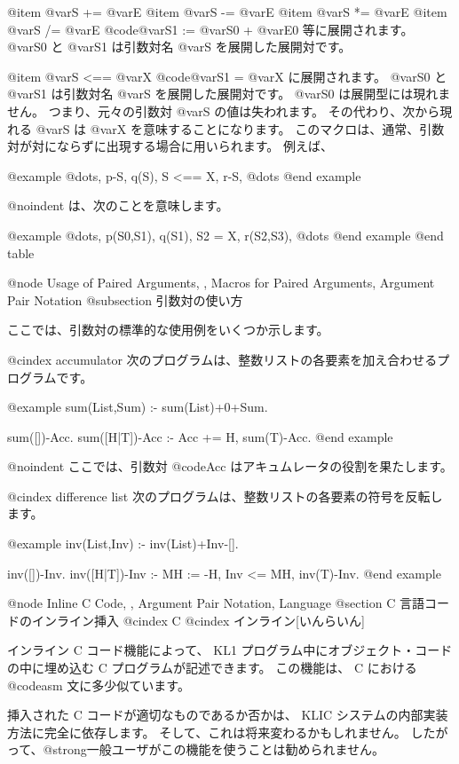 @item @var{S} += @var{E}
@item @var{S} -= @var{E}
@item @var{S} *= @var{E}
@item @var{S} /= @var{E}
 @code{@var{S1} := @var{S0} + @var{E0}} 等に展開されます。 
@var{S0} と @var{S1} は引数対名 @var{S} を展開した展開対です。

@item @var{S} <== @var{X}
@code{@var{S1} = @var{X}} に展開されます。 
@var{S0} と @var{S1} は引数対名 @var{S} を展開した展開対です。 
@var{S0} は展開型には現れません。
つまり、元々の引数対 @var{S} の値は失われます。
その代わり、次から現れる @var{S} は @var{X} を意味することになります。
このマクロは、通常、引数対が対にならずに出現する場合に用いられます。
例えば、

@example
@dots{}, p-S, q(S), S <== X, r-S, @dots{}
@end example

@noindent
は、次のことを意味します。

@example
@dots{}, p(S0,S1), q(S1), S2 = X, r(S2,S3), @dots{}
@end example
@end table

@node Usage of Paired Arguments,  , Macros for Paired Arguments, Argument Pair Notation
@subsection 引数対の使い方

ここでは、引数対の標準的な使用例をいくつか示します。

@cindex accumulator
次のプログラムは、整数リストの各要素を加え合わせるプログラムです。

@example
sum(List,Sum) :- sum(List)+0+Sum.

sum([])-Acc.
sum([H|T])-Acc :- Acc += H, sum(T)-Acc.
@end example

@noindent
ここでは、引数対 @code{Acc} はアキュムレータの役割を果たします。

@cindex difference list
次のプログラムは、整数リストの各要素の符号を反転します。

@example
inv(List,Inv) :- inv(List)+Inv-[].

inv([])-Inv.
inv([H|T])-Inv :- MH := -H, Inv <= MH, inv(T)-Inv.
@end example

@node Inline C Code,  , Argument Pair Notation, Language
@section  C 言語コードのインライン挿入
@cindex C
@cindex インライン[いんらいん]

インライン C コード機能によって、 KL1 プログラム中にオブジェクト・コードの中に埋め込む C プログラムが記述できます。
この機能は、 C における @code{asm} 文に多少似ています。

挿入された C コードが適切なものであるか否かは、 KLIC システムの内部実装方法に完全に依存します。
そして、これは将来変わるかもしれません。
したがって、@strong{一般ユーザがこの機能を使うことは勧められません。}

